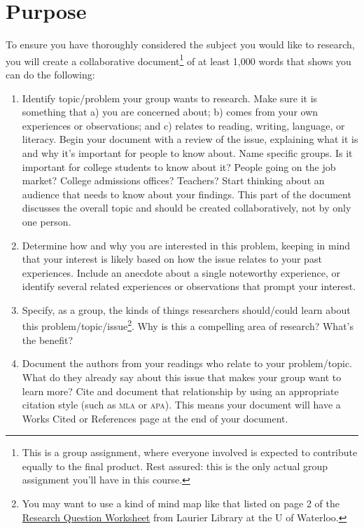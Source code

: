 \documentclass[12pt]{amsart}	%
\begin{document}
\section{Purpose} %
\label{sec:purpose}
To ensure you have thoroughly considered the subject you would like to research, you will create a collaborative document\footnote{This is a group assignment, where everyone involved is expected to contribute equally to the final product. Rest assured: this is the only actual group assignment you'll have in this course.} of at least 1,000 words that shows you can do the following:
\begin{enumerate}
	\item Identify topic/problem your group wants to research. Make sure it is something that a) you are concerned about; b) comes from your own experiences or observations; and c) relates to reading, writing, language, or literacy. Begin your document with a review of the issue, explaining what it is and why it's important for people to know about. Name specific groups. Is it important for college students to know about it? People going on the job market? College admissions offices? Teachers? Start thinking about an audience that needs to know about your findings. This part of the document discusses the overall topic and should be created collaboratively, not by only one person.
	\item  Determine how and why you are interested in this problem, keeping in mind that your interest is likely based on how the issue relates to your past experiences. Include an anecdote about a single noteworthy experience, or identify several related experiences or observations that prompt your interest.
	\item  Specify, as a group, the kinds of things researchers should/could learn about this problem/topic/issue\footnote{You may want to use a kind of mind map like that listed on page 2 of the \href{http://library.wlu.ca/sites/all/pdf/research_question_worksheet.pdf}{Research Question Worksheet} from Laurier Library at the U of Waterloo.}. Why is this a compelling area of research? What's the benefit?
	\item  Document the authors from your readings who relate to your problem/topic. What do they already say about this issue that makes your group want to learn more? Cite and document that relationship by using an appropriate citation style (such as \textsc{mla} or \textsc{apa}). This means your document will have a Works Cited or References page at the end of your document.
\end{enumerate}
\end{document}
